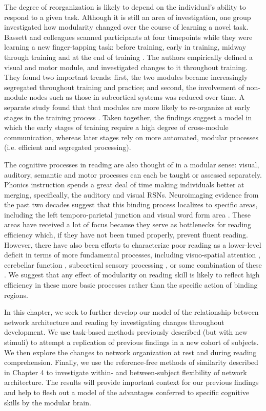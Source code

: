 The degree of reorganization is likely to depend on the individual's ability to respond to a given task. Although it is still an area of investigation, one group investigated how modularity changed over the course of learning a novel task. Bassett and colleagues scanned participants at four timepoints while they were learning a new finger-tapping task: before training, early in training, midway through training and at the end of training \citep{Bassett2015}. The authors empirically defined a visual and motor module, and investigated changes to it throughout training. They found two important trends: first, the two modules became increasingly segregated throughout training and practice; and second, the involvement of non-module nodes such as those in subcortical systems was reduced over time. A separate study found that that modules are more likely to re-organize at early stages in the training process \citep{Bassett2010}. Taken together, the findings suggest a model in which the early stages of training require a high degree of cross-module communication, whereas later stages rely on more automated, modular processes (i.e. efficient and segregated processing). 

The cognitive processes in reading are also thought of in a modular sense: visual, auditory, semantic and motor processes can each be taught or assessed separately. Phonics instruction spends a great deal of time making individuals better at merging, specifically, the auditory and visual RSNs. Neuroimaging evidence from the past two decades suggest that this binding process localizes to specific areas, including the left temporo-parietal junction and visual word form area \citep{Price2012}. These areas have received a lot of focus because they serve as bottlenecks for reading efficiency which, if they have not been tuned properly, prevent fluent reading. However, there have also been efforts to characterize poor reading as a lower-level deficit in terms of more fundamental processes, including visuo-spatial attention \citep{Vidyasagar2010}, cerebellar function \citep{Pernet2009, Eckert2003},  subcortical sensory processing \citep{Stein1997, Fan2014}, or some combination of these \citep{Pernet2009}. We suggest that any effect of modularity on reading skill is likely to reflect high efficiency in these more basic processes rather than the specific action of binding regions. 

In this chapter, we seek to further develop our model of the relationship between network architecture and reading by investigating changes throughout development. We use task-based methods previously described (but with new stimuli) to attempt a replication of previous findings in a new cohort of subjects.  We then explore the changes to network organization at rest and during reading comprehension. Finally, we use the reference-free methods of similarity described in Chapter 4 to investigate within- and between-subject flexibility of network architecture. The results will provide important context for our previous findings and help to flesh out a model of the advantages conferred to specific cognitive skills by the modular brain.



